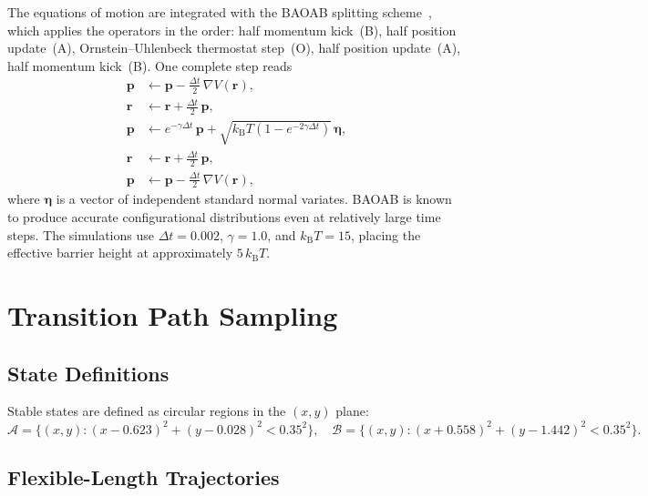 \documentclass[11pt,a4paper]{article}
\begin{document}
The equations of motion are integrated with the BAOAB splitting
scheme~\cite{Leimkuhler2013}, which applies the operators in the order:
half momentum kick~(B), half position update~(A), Ornstein--Uhlenbeck
thermostat step~(O), half position update~(A), half momentum kick~(B).  One
complete step reads
\begin{align}
    \mathbf{p} &\leftarrow \mathbf{p} - \tfrac{\Delta t}{2}\,\nabla V(\mathbf{r}), \\
    \mathbf{r} &\leftarrow \mathbf{r} + \tfrac{\Delta t}{2}\,\mathbf{p}, \\
    \mathbf{p} &\leftarrow e^{-\gamma\Delta t}\,\mathbf{p}
                 + \sqrt{k_\mathrm{B}T\!\left(1 - e^{-2\gamma\Delta t}\right)}\,\boldsymbol{\eta}, \\
    \mathbf{r} &\leftarrow \mathbf{r} + \tfrac{\Delta t}{2}\,\mathbf{p}, \\
    \mathbf{p} &\leftarrow \mathbf{p} - \tfrac{\Delta t}{2}\,\nabla V(\mathbf{r}),
\end{align}
where $\boldsymbol{\eta}$ is a vector of independent standard normal variates.
BAOAB is known to produce accurate configurational distributions even at
relatively large time steps.  The simulations use $\Delta t = 0.002$,
$\gamma = 1.0$, and $k_\mathrm{B}T = 15$, placing the effective barrier height
at approximately $5\,k_\mathrm{B}T$.

\section{Transition Path Sampling}

\subsection{State Definitions}

Stable states are defined as circular regions in the $(x,y)$ plane:
\begin{equation}
    \mathcal{A} = \bigl\{(x,y) : (x-0.623)^2 + (y-0.028)^2 < 0.35^2\bigr\}, \quad
    \mathcal{B} = \bigl\{(x,y) : (x+0.558)^2 + (y-1.442)^2 < 0.35^2\bigr\}.
\end{equation}

\subsection{Flexible-Length Trajectories}
\end{document}
